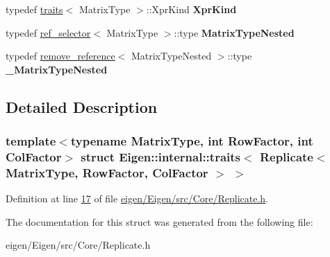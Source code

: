 \begin{DoxyCompactItemize}
typedef \hyperlink{struct_eigen_1_1internal_1_1traits}{traits}$<$ Matrix\+Type $>$\+::Xpr\+Kind {\bfseries Xpr\+Kind}
\item 
\mbox{\label{struct_eigen_1_1internal_1_1traits_3_01_replicate_3_01_matrix_type_00_01_row_factor_00_01_col_factor_01_4_01_4_a06094f652fe7d281b1febd7252bfd1b9}} 
typedef \hyperlink{struct_eigen_1_1internal_1_1ref__selector}{ref\+\_\+selector}$<$ Matrix\+Type $>$\+::type {\bfseries Matrix\+Type\+Nested}
\item 
\mbox{\label{struct_eigen_1_1internal_1_1traits_3_01_replicate_3_01_matrix_type_00_01_row_factor_00_01_col_factor_01_4_01_4_a3c6f5df06bf46df6cbf5250ba5a22453}} 
typedef \hyperlink{struct_eigen_1_1internal_1_1remove__reference}{remove\+\_\+reference}$<$ Matrix\+Type\+Nested $>$\+::type {\bfseries \+\_\+\+Matrix\+Type\+Nested}
\end{DoxyCompactItemize}


\subsection{Detailed Description}
\subsubsection*{template$<$typename Matrix\+Type, int Row\+Factor, int Col\+Factor$>$\newline
struct Eigen\+::internal\+::traits$<$ Replicate$<$ Matrix\+Type, Row\+Factor, Col\+Factor $>$ $>$}



Definition at line \hyperlink{eigen_2_eigen_2src_2_core_2_replicate_8h_source_l00017}{17} of file \hyperlink{eigen_2_eigen_2src_2_core_2_replicate_8h_source}{eigen/\+Eigen/src/\+Core/\+Replicate.\+h}.



The documentation for this struct was generated from the following file\+:\begin{DoxyCompactItemize}
\item 
eigen/\+Eigen/src/\+Core/\+Replicate.\+h\end{DoxyCompactItemize}
